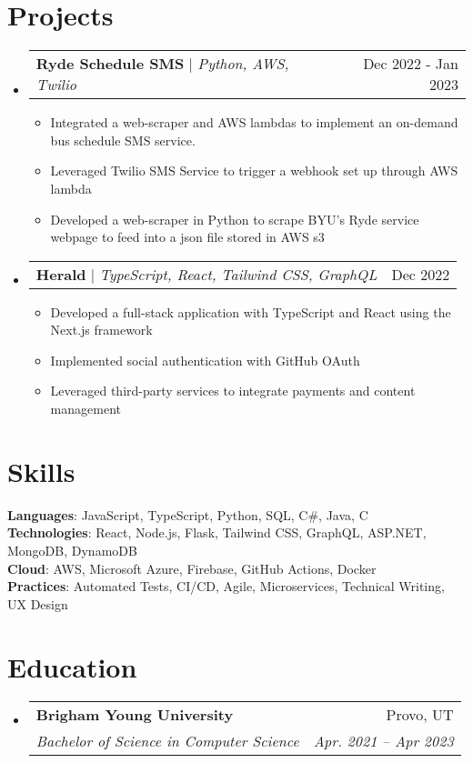 \documentclass[letterpaper,11pt]{article}
\makeatletter
\newcommand{\resumeItem}[1]{
  \item\small{
    {#1 \vspace{-2pt}}
  }
}
\newcommand{\resumeSubheading}[4]{
  \vspace{-2pt}\item
    \begin{tabular*}{0.97\textwidth}[t]{l@{\extracolsep{\fill}}r}
      \textbf{#1} & #2 \\
      \textit{\small#3} & \textit{\small #4} \\
    \end{tabular*}\vspace{-7pt}
}
\newcommand{\resumeProjectHeading}[2]{
    \item
    \begin{tabular*}{0.97\textwidth}{l@{\extracolsep{\fill}}r}
      \small#1 & #2 \\
    \end{tabular*}\vspace{-7pt}
}
\newcommand{\resumeSubHeadingListStart}{\begin{itemize}[leftmargin=0.15in, label={}]}
\newcommand{\resumeSubHeadingListEnd}{\end{itemize}}
\newcommand{\resumeItemListStart}{\begin{itemize}}
\newcommand{\resumeItemListEnd}{\end{itemize}\vspace{-5pt}}
\makeatother
\begin{document}
\section{Projects}
    \resumeSubHeadingListStart
      \resumeProjectHeading
          {\textbf{Ryde Schedule SMS} $|$ \emph{Python, AWS, Twilio}}{Dec 2022 - Jan 2023}
          \resumeItemListStart
            \resumeItem{Integrated a web-scraper and AWS lambdas to implement an on-demand bus schedule SMS service.}
            \resumeItem{Leveraged Twilio SMS Service to trigger a webhook set up through AWS lambda}
            \resumeItem{Developed a web-scraper in Python to scrape BYU's Ryde service webpage to feed into a json file stored in AWS s3}
          \resumeItemListEnd
      \resumeProjectHeading
          {\textbf{Herald} $|$ \emph{TypeScript, React, Tailwind CSS, GraphQL}}{Dec 2022}
          \resumeItemListStart
            \resumeItem{Developed a full-stack application with TypeScript and React using the Next.js framework}
            \resumeItem{Implemented social authentication with GitHub OAuth}
            \resumeItem{Leveraged third-party services to integrate payments and content management}
          \resumeItemListEnd
    \resumeSubHeadingListEnd



\section{Skills}
 \begin{itemize}[leftmargin=0.15in, label={}]
    \small{\item{
     \textbf{Languages}{: JavaScript, TypeScript, Python, SQL, C\#, Java, C} \\
     \textbf{Technologies}{: React, Node.js, Flask, Tailwind CSS, GraphQL, ASP.NET, MongoDB, DynamoDB} \\
     \textbf{Cloud}{: AWS, Microsoft Azure, Firebase, GitHub Actions, Docker} \\
     \textbf{Practices}{: Automated Tests, CI/CD, Agile, Microservices, Technical Writing, UX Design}
    }}
 \end{itemize}

\section{Education}
  \resumeSubHeadingListStart
    \resumeSubheading
      {Brigham Young University}{Provo, UT}
      {Bachelor of Science in Computer Science}{Apr. 2021 -- Apr 2023}
  \resumeSubHeadingListEnd


\end{document}
